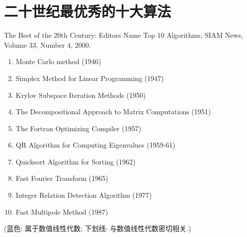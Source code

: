 \documentclass{book}
\begin{document}
\section{二十世纪最优秀的十大算法}
The Best of the 20th Century: Editors Name Top 10 Algorithms, SIAM News, Volume 33, Number 4, 2000.
\begin{enumerate}
    \item Monte Carlo method (1946)
    \item Simplex Method for Linear Programming (1947)
    \item {\color{blue} Krylov Subspace Iteration Methods (1950)}
    \item {\color{blue} The Decompositional Approach to Matrix Computations
        (1951)}
    \item The Fortran Optimizing Compiler (1957)
    \item {\color{blue} QR Algorithm for Computing Eigenvalues (1959-61)}
    \item Quicksort Algorithm for Sorting (1962)
    \item Fast Fourier Transform (1965)
    \item Integer Relation Detection Algorithm (1977)
    \item Fast Multipole Method (1987)
\end{enumerate}
(蓝色: 属于数值线性代数; 下划线: 与数值线性代数密切相关.)


\cite{shi2000}


\end{document}

